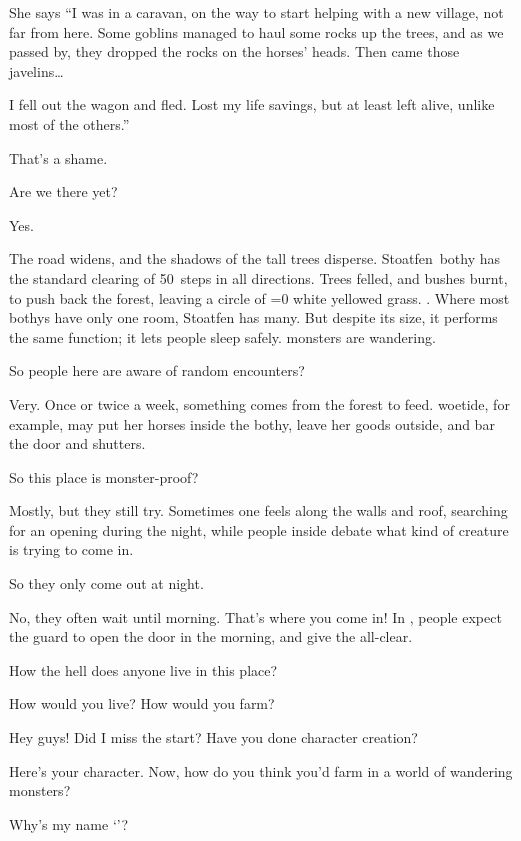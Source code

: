\begin{multicols}{3}
\begin{description}
  She says
  ``I was in a caravan, on the way to start helping with a new \gls{village}, not far from here.
  Some goblins managed to haul some rocks up the trees, and as we passed by, they dropped the rocks on the horses' heads.
  Then came those javelins\ldots

  I fell out the wagon and fled.
  Lost my life savings, but at least left alive, unlike most of the others.''

  \item[Player 1:]
  That's a shame.
  \item[Player 2:]
  Are we there yet?
  \item[\Glsentrytext{gm}:]
  Yes.

  The road widens, and the shadows of the tall trees disperse.
  Stoatfen~\Gls{bothy} has the standard clearing of 50~\glspl{step} in all directions.
  Trees felled, and bushes burnt, to push back the forest, leaving a circle of
  \ifnum\value{temperature}=0%
    white%
  \else%
    yellowed grass.
  \fi.%
  Where most \glspl{bothy} have only one room, Stoatfen has many.
  But despite its size, it performs the same function; it lets people sleep safely.
  \Glspl{monster} are wandering.
  \item[Player 1:]
  So people here are aware of random encounters?
  \item[\Glsentrytext{gm}:]
  Very.
  Once or twice a week, something comes from the forest to feed.
  \Gls{woetide}, for example, may put her horses inside the \gls{bothy}, leave her goods outside, and bar the door and shutters.
  \item[Player 2:]
  So this place is \gls{monster}-proof?
  \item[\Glsentrytext{gm}:]
  Mostly, but they still try.
  Sometimes one feels along the walls and roof, searching for an opening during the night, while people inside debate what kind of creature is trying to come in.
  \item[Player 1:]
  So they only come out at night.
  \item[\Glsentrytext{gm}:]
  No, they often wait until morning.
  That's where you come in!
  In , people expect the \gls{guard} to open the door in the morning, and give the all-clear.
  \item[Player 2:]
  How the hell does anyone live in this place?
  \item[\Glsentrytext{gm}:]
  How would you live?
  How would you farm?
  \item[Player 3:]
  Hey guys!
  Did I miss the start?
  Have you done character creation?
  \item[\Glsentrytext{gm}:]
  Here's your character.
  Now, how do you think you'd farm in a world of wandering monsters?
  \item[Player 3:]
  Why's my name `\composeHumanName'?
\end{description}


\end{multicols}

